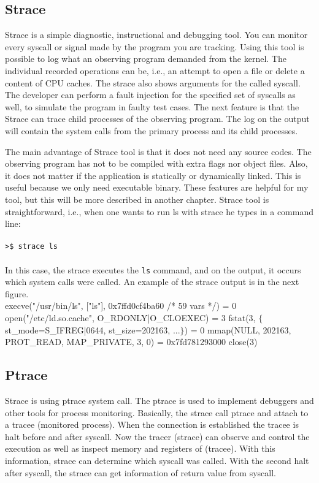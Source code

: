 \subsection{Strace}
\label{sec:strace}

Strace\cite{strace_man} is a simple diagnostic, instructional and debugging tool.
You can monitor every syscall or signal made by the program you are tracking.
Using this tool is possible to log what an observing program demanded from the kernel.
The individual recorded operations can be, i.e., an attempt to open a file or delete a content of CPU caches.
The strace also shows arguments for the called syscall.
The developer can perform a fault injection for the specified set of syscalls as well, to simulate the program in faulty test cases.
The next feature is that the Strace can trace child processes of the observing program.
The log on the output will contain the system calls from the primary process and its child processes.

The main advantage of Strace tool is that it does not need any source codes.
The observing program has not to be compiled with extra flags nor object files.
Also, it does not matter if the application is statically or dynamically linked.
This is useful because we only need executable binary.
These features are helpful for my tool, but this will be more described in another chapter.
Strace tool is straightforward, i.e., when one wants to run ls with strace he types in a command line:\\
\\
\texttt{>\$ strace ls}\\
\\
In this case, the strace executes the \texttt{ls} command, and on the output, it occurs which system calls were called.
An example of the strace output is in the next figure.\\[2mm]

\selectfont\noindent
execve("/usr/bin/ls", ["ls"], 0x7ffd0cf4ba60 /* 59 vars */) = 0\linebreak
open("/etc/ld.so.cache", O\_RDONLY|O\_CLOEXEC) = 3\linebreak
fstat(3, $\{$ st\_mode=S\_IFREG|0644, st\_size=202163, ...$\}$) = 0\linebreak
mmap(NULL, 202163, PROT\_READ, MAP\_PRIVATE, 3, 0) = 0x7fd781293000\linebreak
close(3)\linebreak
\fontfamily{\familydefault}\selectfont

\subsection{Ptrace}
Strace is using ptrace\cite{ptrace_man} system call.
The ptrace is used to  implement debuggers and other tools for process monitoring.
Basically, the strace call ptrace and attach to a tracee (monitored process).
When the connection is established the tracee is halt before and after syscall.
Now the tracer (strace) can observe and control the execution as well as inspect memory and registers of (tracee).
With this information, strace can determine which syscall was called.
With the second halt after syscall, the strace can get information of return value from syscall.

